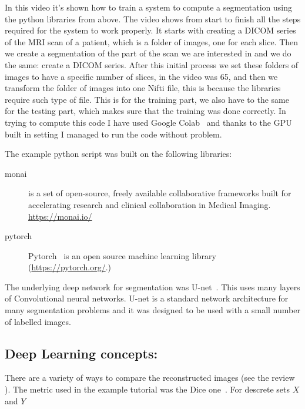 \documentclass[12pt]{article}
\begin{document}
In this video it’s shown how to train a system to compute a
segmentation using the python libraries from above. The video shows
from start to finish all the steps required for the system to work
properly. It starts with creating a DICOM series of the MRI scan of a
patient, which is a folder of images, one for each slice. Then we
create a segmentation of the part of the scan we are interested in and
we do the same: create a DICOM series. After this initial process we
set these folders of images to have a specific number of slices, in
the video was 65, and then we transform the folder of images into one
Nifti file, this is because the libraries require such type of
file. This is for the training part, we also have to the same for the
testing part, which makes sure that the training was done correctly.
In trying to compute this code I have used Google Colab~\cite{bisong2019google}
and thanks to
the GPU built in setting I managed to run the code without problem.


The example python script was built on the following libraries:

\begin{description}

  \item[monai] is a set of open-source, freely available collaborative frameworks built for accelerating research and clinical collaboration in Medical Imaging.  \url{https://monai.io/}

\item[pytorch] Pytorch~\cite{paszke2019pytorch}
  is an open source machine learning library  (\url{https://pytorch.org/}.)
    
\end{description}

The underlying deep network for segmentation was
U-net~\cite{ronneberger2015u}.  This uses many layers of Convolutional
neural networks.  U-net is a standard network architecture for many
segmentation problems and it was designed to be used with a small
number of labelled images.


\subsection{Deep Learning concepts:}

There are a variety of ways to compare the reconstructed images (see
the review~\cite{taha2015metrics} ).  The metric used in the example
tutorial was the Dice one~\cite{zijdenbos1994morphometric}.
For descrete sets $X$ and $Y$ 
\end{document}
